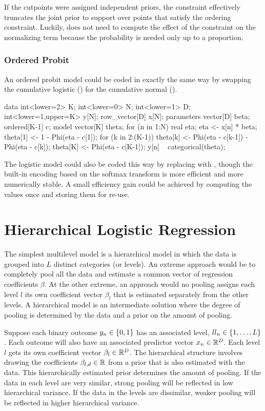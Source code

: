 If the cutpoints were assigned independent priors, the constraint
effectively truncates the joint prior to support over points that
satisfy the ordering constraint.  Luckily, \Stan does not need to
compute the effect of the constraint on the normalizing term because
the probability is needed only up to a proportion.


\subsubsection{Ordered Probit}

An ordered probit model could be coded in exactly the same way by
swapping the cumulative logistic () for the cumulative
normal ().
%

\begin{stancode}
data {
  int<lower=2> K;
  int<lower=0> N;
  int<lower=1> D;
  int<lower=1,upper=K> y[N];
  row_vector[D] x[N];
}
parameters {
  vector[D] beta;
  ordered[K-1] c;
}
model {
  vector[K] theta;
  for (n in 1:N) {
    real eta;
    eta <- x[n] * beta;
    theta[1] <- 1 - Phi(eta - c[1]);
    for (k in 2:(K-1))
      theta[k] <- Phi(eta - c[k-1]) - Phi(eta - c[k]);
    theta[K] <- Phi(eta - c[K-1]);
    y[n] ~ categorical(theta);
  }
}
\end{stancode}
%
The logistic model could also be coded this way by replacing
 with , though the built-in encoding based
on the softmax transform is more efficient and more numerically
stable.  A small efficiency gain could be achieved by computing the
values  once and storing them for re-use.


\section{Hierarchical Logistic Regression}

The simplest multilevel model is a hierarchical model in which the
data is grouped into $L$ distinct categories (or levels).  An extreme approach would be to
completely pool all the data and estimate a common vector of
regression coefficients $\beta$.  At the other extreme, an approach
would no pooling assigns each level $l$ its own coefficient vector
$\beta_l$ that is estimated separately from the other levels.  A
hierarchical model is an intermediate solution where the degree of
pooling is determined by the data and a prior on the amount of
pooling.

Suppose each binary outcome $y_n \in \setlist{0,1}$ has an associated
level, $ll_n \in \setlist{1,\ldots,L}$.  Each outcome will also have
an associated predictor vector $x_n \in \reals^D$.  Each level $l$
gets its own coefficient vector $\beta_l \in \reals^D$.  The
hierarchical structure involves drawing the coefficients $\beta_{l,d}
\in \reals$ from a prior that is also estimated with the data.  This
hierarchically estimated prior determines the amount of pooling.  If
the data in each level are very similar, strong pooling will be
reflected in low hierarchical variance.  If the data in the levels are
dissimilar, weaker pooling will be reflected in higher hierarchical variance.

